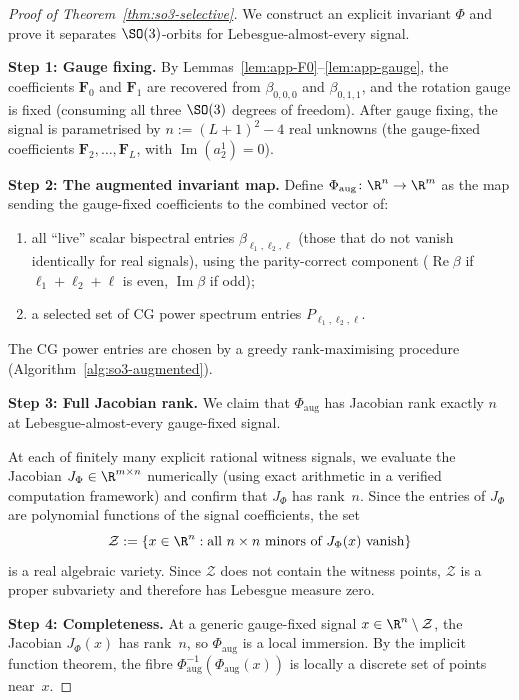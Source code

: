 \begin{proof}[Proof of Theorem~\ref{thm:so3-selective}]
We construct an explicit invariant $\Phi$ and prove it separates
$\SO(3)$-orbits for Lebesgue-almost-every signal.

\medskip\noindent
\textbf{Step 1: Gauge fixing.}
By Lemmas~\ref{lem:app-F0}--\ref{lem:app-gauge}, the coefficients
$\mathbf{F}_0$ and $\mathbf{F}_1$ are recovered from
$\beta_{0,0,0}$ and $\beta_{0,1,1}$, and the rotation gauge is
fixed (consuming all three $\SO(3)$ degrees of freedom). After
gauge fixing, the signal is parametrised by
$n := (L{+}1)^2 - 4$ real unknowns (the gauge-fixed coefficients
$\mathbf{F}_2, \dotsc, \mathbf{F}_L$, with
$\operatorname{Im}(a_2^1) = 0$).

\medskip\noindent
\textbf{Step 2: The augmented invariant map.}
Define $\Phi_{\mathrm{aug}} \colon \R^n \to \R^m$ as the map sending
the gauge-fixed coefficients to the combined vector of:
\begin{enumerate}[nosep]
  \item all ``live'' scalar bispectral entries
    $\beta_{\ell_1,\ell_2,\ell}$ (those that do not vanish
    identically for real signals), using the parity-correct
    component ($\operatorname{Re}\beta$ if
    $\ell_1{+}\ell_2{+}\ell$ is even,
    $\operatorname{Im}\beta$ if odd);
  \item a selected set of CG power spectrum entries
    $P_{\ell_1,\ell_2,\ell}$.
\end{enumerate}
The CG power entries are chosen by a greedy rank-maximising procedure
(Algorithm~\ref{alg:so3-augmented}).

\medskip\noindent
\textbf{Step 3: Full Jacobian rank.}
We claim that $\Phi_{\mathrm{aug}}$ has Jacobian rank exactly $n$ at
Lebesgue-almost-every gauge-fixed signal.

At each of finitely many explicit rational witness signals, we
evaluate the Jacobian $J_\Phi \in \R^{m \times n}$ numerically
(using exact arithmetic in a verified computation framework) and
confirm that $J_\Phi$ has rank~$n$. Since the entries of $J_\Phi$
are polynomial functions of the signal coefficients, the set
\[
  \mathcal{Z} := \{x \in \R^n : \text{all } n \times n \text{ minors
  of } J_\Phi(x) \text{ vanish}\}
\]
is a real algebraic variety. Since $\mathcal{Z}$ does not contain
the witness points, $\mathcal{Z}$ is a proper subvariety and
therefore has Lebesgue measure zero.

\medskip\noindent
\textbf{Step 4: Completeness.}
At a generic gauge-fixed signal $x \in \R^n \setminus \mathcal{Z}$,
the Jacobian $J_\Phi(x)$ has rank~$n$, so $\Phi_{\mathrm{aug}}$ is
a local immersion. By the implicit function theorem, the fibre
$\Phi_{\mathrm{aug}}^{-1}(\Phi_{\mathrm{aug}}(x))$ is locally a
discrete set of points near~$x$.


\end{proof}

